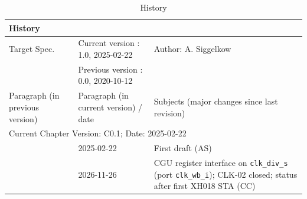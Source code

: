 \begin{table}[H]
\caption{History}
\label{tab:arch_history04}
\centering
\begin{tabularx}{\textwidth}{|X |X |X |}
  \hline
  \multicolumn{3}{|l|}{History} \\
  \hline
  \multicolumn{1}{|l}{Target Spec.} & \multicolumn{1}{l}{Current version : 1.0, 2025-02-22} & \multicolumn{1}{l|}{Author: A. Siggelkow}\\
  \multicolumn{1}{|l}{ } & \multicolumn{1}{l}{Previous version : 0.0, 2020-10-12} & \multicolumn{1}{l|}{ }\\
  \hline
  \hline
  Paragraph (in previous version) & Paragraph (in current version) / date & Subjects (major changes since last revision) \\
  \hline
  \hline
  \multicolumn{3}{|l|}{Current Chapter Version: C0.1; Date: 2025-02-22} \\
  \hline
  & 2025-02-22 & First draft (AS) \\
  \hline
  & 2026-11-26 & CGU register interface on \texttt{clk\_div\_s} (port \texttt{clk\_wb\_i}); CLK-02 closed; status after first XH018 STA (CC) \\
  \hline
\end{tabularx}
\end{table}

